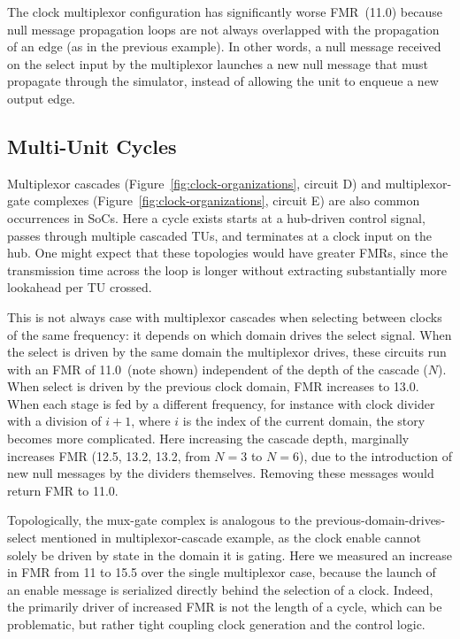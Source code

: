 The clock multiplexor configuration has significantly worse FMR~(11.0) because null message propagation loops
are not always overlapped with the propagation of an edge (as in the previous
example). In other words, a null message received on the select input by the multiplexor launches a new
null message that must propagate through the simulator, instead of allowing the
unit to enqueue a new output edge.

\subsection{Multi-Unit Cycles}
Multiplexor cascades (Figure~\ref{fig:clock-organizations}, circuit D) and
multiplexor-gate complexes (Figure~\ref{fig:clock-organizations}, circuit E) are also
common occurrences in SoCs. Here a cycle exists starts at a hub-driven control
signal, passes through multiple cascaded TUs, and terminates at a clock input on the
hub. One might expect that these topologies would have greater FMRs, since the
transmission time across the loop is longer without extracting substantially
more lookahead per TU crossed.

This is not always case with multiplexor cascades when selecting between clocks
of the same frequency: it depends on which domain drives the select signal.
When the select is driven by the same domain the multiplexor drives, these
circuits run with an FMR of 11.0~(note shown) independent of the depth of the cascade ($N$).
When select is driven by the previous clock domain, FMR increases to 13.0.
When each stage is fed by a different frequency, for instance with clock
divider with a division of $i+1$, where $i$ is the index of the current domain,
the story becomes more complicated. Here increasing the cascade depth,
marginally increases FMR (12.5, 13.2, 13.2, from $N=3$ to $N=6$), due to the
introduction of new null messages by the dividers themselves. Removing these
messages would return FMR to 11.0.

Topologically, the mux-gate complex is analogous to the
previous-domain-drives-select mentioned in multiplexor-cascade example, as the
clock enable cannot solely be driven by state in the domain it is gating. Here we
measured an increase in FMR from 11 to 15.5 over the single multiplexor case, because
the launch of an enable message is serialized directly behind the selection of a
clock. Indeed, the primarily driver of increased FMR is not the length of a
cycle, which can be problematic, but rather tight coupling clock generation and
the control logic.

